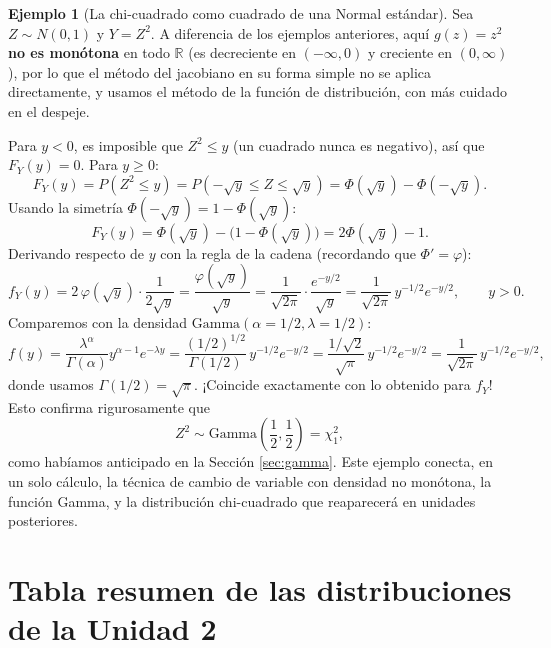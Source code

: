 \documentclass[11pt,a4paper]{article}
\theoremstyle{plain}
\theoremstyle{definition}
\newtheorem{ejemplo}[teorema]{Ejemplo}
\theoremstyle{remark}
\begin{document}
\begin{ejemplo}[La chi-cuadrado como cuadrado de una Normal estándar]\label{ej:chi_cuadrado}
Sea $Z\sim N(0,1)$ y $Y=Z^2$. A diferencia de los ejemplos anteriores, aquí $g(z)=z^2$ \textbf{no es monótona} en todo $\mathbb{R}$ (es decreciente en $(-\infty,0)$ y creciente en $(0,\infty)$), por lo que el método del jacobiano en su forma simple no se aplica directamente, y usamos el método de la función de distribución, con más cuidado en el despeje.

Para $y<0$, es imposible que $Z^2\le y$ (un cuadrado nunca es negativo), así que $F_Y(y)=0$. Para $y\ge0$:
$$F_Y(y)=P(Z^2\le y)=P(-\sqrt y\le Z\le\sqrt y)=\Phi(\sqrt y)-\Phi(-\sqrt y).$$
Usando la simetría $\Phi(-\sqrt y)=1-\Phi(\sqrt y)$:
$$F_Y(y)=\Phi(\sqrt y)-\big(1-\Phi(\sqrt y)\big)=2\Phi(\sqrt y)-1.$$
Derivando respecto de $y$ con la regla de la cadena (recordando que $\Phi'=\varphi$):
$$f_Y(y)=2\,\varphi(\sqrt y)\cdot\frac{1}{2\sqrt y}=\frac{\varphi(\sqrt y)}{\sqrt y}=\frac{1}{\sqrt{2\pi}}\cdot\frac{e^{-y/2}}{\sqrt y}=\frac{1}{\sqrt{2\pi}}\,y^{-1/2}e^{-y/2},\qquad y>0.$$
Comparemos con la densidad $\text{Gamma}(\alpha=1/2,\lambda=1/2)$:
$$f(y)=\frac{\lambda^\alpha}{\Gamma(\alpha)}y^{\alpha-1}e^{-\lambda y}=\frac{(1/2)^{1/2}}{\Gamma(1/2)}\,y^{-1/2}e^{-y/2}=\frac{1/\sqrt2}{\sqrt\pi}\,y^{-1/2}e^{-y/2}=\frac{1}{\sqrt{2\pi}}\,y^{-1/2}e^{-y/2},$$
donde usamos $\Gamma(1/2)=\sqrt\pi$. ¡Coincide exactamente con lo obtenido para $f_Y$! Esto confirma rigurosamente que
$$Z^2\sim\text{Gamma}\left(\frac12,\frac12\right)=\chi^2_1,$$
como habíamos anticipado en la Sección \ref{sec:gamma}. Este ejemplo conecta, en un solo cálculo, la técnica de cambio de variable con densidad no monótona, la función Gamma, y la distribución chi-cuadrado que reaparecerá en unidades posteriores.
\end{ejemplo}

\newpage
\section{Tabla resumen de las distribuciones de la Unidad 2}
\end{document}
